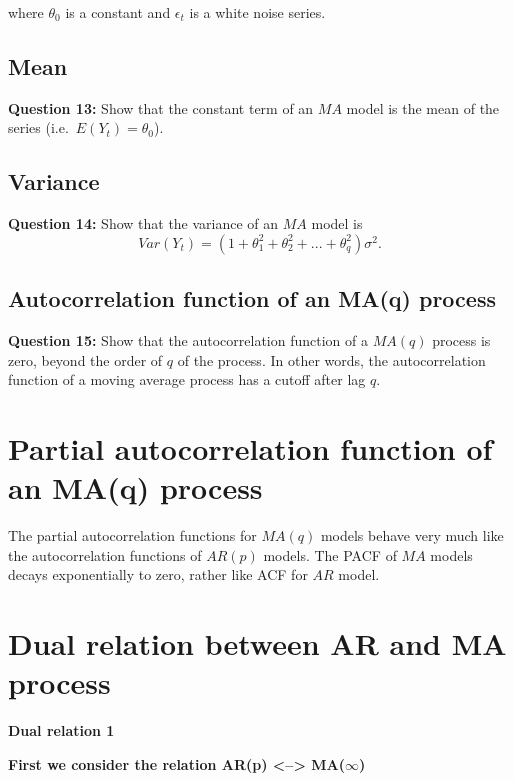 \documentclass[
  11pt,
  a4paper,
]{report}
\begin{document}
where \(\theta_0\) is a constant and \({\epsilon_t}\) is a white noise
series.

\subsection{Mean}\label{mean-5}

\textbf{Question 13:} Show that the constant term of an \(MA\) model is
the mean of the series (i.e.~\(E(Y_t)=\theta_0\)).

\subsection{Variance}\label{variance-4}

\textbf{Question 14:} Show that the variance of an \(MA\) model is
\[Var(Y_t)=(1+\theta_1^2+\theta_2^2+...+\theta_q^2)\sigma^2.\]

\subsection{Autocorrelation function of an MA(q)
process}\label{autocorrelation-function-of-an-maq-process}

\textbf{Question 15:} Show that the autocorrelation function of a
\(MA(q)\) process is zero, beyond the order of \(q\) of the process. In
other words, the autocorrelation function of a moving average process
has a cutoff after lag \(q\).

\section{Partial autocorrelation function of an MA(q)
process}\label{partial-autocorrelation-function-of-an-maq-process}

The partial autocorrelation functions for \(MA(q)\) models behave very
much like the autocorrelation functions of \(AR(p)\) models. The PACF of
\(MA\) models decays exponentially to zero, rather like ACF for \(AR\)
model.

\section{Dual relation between AR and MA
process}\label{dual-relation-between-ar-and-ma-process}

\textbf{Dual relation 1}

\textbf{First we consider the relation AR(p) \textless--\textgreater{}
MA(}\(\infty\)\textbf{)}
\end{document}
